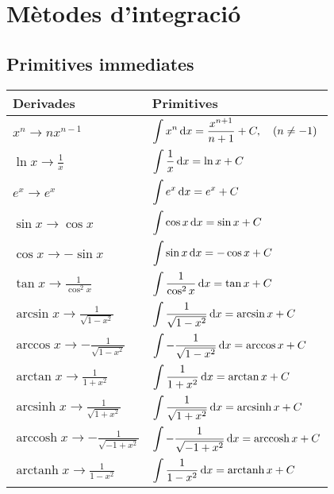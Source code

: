 \section{Mètodes d'integració}
\subsection{Primitives immediates}
\begin{table}[H]
    \centering
    \begin{tabular}{ll}
        \toprule
        \toprule
        Derivades & Primitives \\
        \midrule
        $\displaystyle x^{n} \to n x^{n-1} $ & $\displaystyle  \int x^{n} \mathop{}\!\mathrm{d} x = \frac{x^{n+1}}{n+1} + C , \quad (n \neq -1) $ \\
        $\displaystyle \ln x \to \frac{1}{x} $ & $\displaystyle  \int \frac{1}{x} \mathop{}\!\mathrm{d} x = \ln x + C $ \\
        $\displaystyle e^{x} \to e^{x} $ & $\displaystyle  \int e^{x} \mathop{}\!\mathrm{d} x = e^{x} + C $ \\
        $\displaystyle \sin x \to \cos x $ & $\displaystyle  \int \cos x \mathop{}\!\mathrm{d} x = \sin x + C $ \\
        $\displaystyle \cos x \to - \sin x $ & $\displaystyle  \int \sin x \mathop{}\!\mathrm{d} x = - \cos x + C $ \\
        $\displaystyle \tan x \to \frac{1}{\cos^{2} x} $ & $\displaystyle  \int \frac{1}{\cos^{2} x} \mathop{}\!\mathrm{d} x = \tan x + C $ \\
        $\displaystyle \arcsin x \to \frac{1}{\sqrt{1 - x^{2}}} $ & $\displaystyle  \int \frac{1}{\sqrt{1 - x^{2}}} \mathop{}\!\mathrm{d} x = \arcsin x + C $ \\
        $\displaystyle \arccos x \to - \frac{1}{\sqrt{1 - x^{2}}} $ & $\displaystyle  \int - \frac{1}{\sqrt{1 - x^{2}}} \mathop{}\!\mathrm{d} x = \arccos x + C $ \\
        $\displaystyle \arctan x \to \frac{1}{1 + x^{2}} $ & $\displaystyle  \int \frac{1}{1 + x^{2}} \mathop{}\!\mathrm{d} x = \arctan x + C $ \\
        $\displaystyle \operatorname{arcsinh} x \to \frac{1}{\sqrt{1 + x^{2}}} $ & $\displaystyle  \int \frac{1}{\sqrt{1 + x^{2}}} \mathop{}\!\mathrm{d} x = \operatorname{arcsinh} x + C $ \\
        $\displaystyle \operatorname{arccosh} x \to - \frac{1}{\sqrt{- 1 + x^{2}}} $ & $\displaystyle  \int - \frac{1}{\sqrt{- 1 + x^{2}}} \mathop{}\!\mathrm{d} x = \operatorname{arccosh} x + C $ \\
        $\displaystyle \operatorname{arctanh} x \to \frac{1}{1 - x^{2}} $ & $\displaystyle  \int \frac{1}{1 - x^{2}} \mathop{}\!\mathrm{d} x = \operatorname{arctanh} x + C $ \\
    \bottomrule
    \end{tabular}
\end{table}

